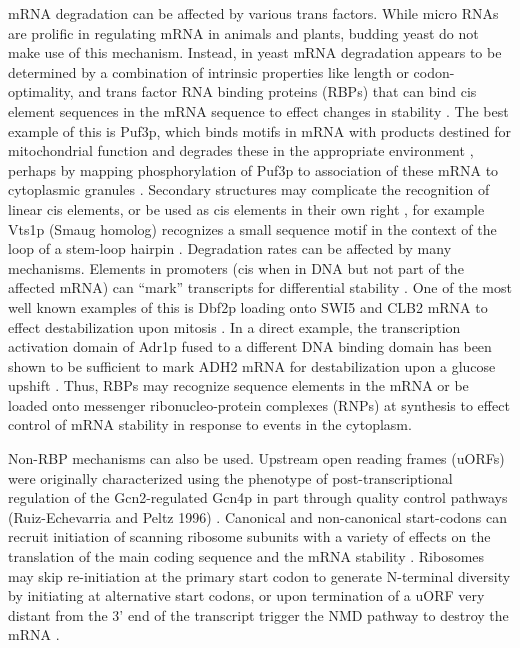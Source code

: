mRNA
degradation can be affected by various trans factors. While micro RNAs
are prolific in regulating mRNA in animals and plants, budding yeast
do not make use of this mechanism. Instead, in yeast mRNA degradation
appears to be determined by a combination of intrinsic properties like
length or codon-optimality, and trans factor RNA binding proteins
(RBPs) that can bind cis element sequences in the mRNA sequence to
effect changes in stability 
\parencite{li2010predicting,cheng2017cis}. The best
example of this is Puf3p, which binds motifs in mRNA with products
destined for mitochondrial function and degrades these in the
appropriate environment 
\parencite{olivas2000puf3,miller2013carbon}, perhaps by
mapping phosphorylation of Puf3p to association of these mRNA to
cytoplasmic granules 
\parencite{lee2015glucose}. Secondary structures may
complicate the recognition of linear cis elements, or be used as cis
elements in their own right \parencite{li2010predicting},
for example Vts1p (Smaug homolog) recognizes a small sequence 
motif in the context of the loop of a stem-loop hairpin 
\parencite{she2017comprehensive,aviv2003rna}.
Degradation rates can be affected by many mechanisms. Elements in
promoters (cis when in DNA but not part of the affected mRNA) can
“mark” transcripts for differential stability 
\parencite{haimovich2013gene}.
One of the most well known examples of this is Dbf2p loading onto SWI5
and CLB2 mRNA to effect destabilization upon mitosis 
\parencite{trcek2011single}. 
In a direct example, the transcription activation domain of
Adr1p fused to a different DNA binding domain has been shown to be
sufficient to mark ADH2 mRNA for destabilization upon a glucose
upshift \parencite{braun2016snf1}.
Thus, RBPs may recognize sequence
elements in the mRNA or be loaded onto messenger ribonucleo-protein
complexes (RNPs) at synthesis 
\parencite{gupta2016translational}
to effect control of
mRNA stability in response to events in the cytoplasm.  

Non-RBP
mechanisms can also be used. Upstream open reading frames (uORFs) were
originally characterized using the phenotype of post-transcriptional
regulation of the Gcn2-regulated Gcn4p 
\parencite{dever1992phosphorylation}
in part
through quality control pathways 
(Ruiz-Echevarria and Peltz 1996)
\parencite{ruiz1996utilizing}.
Canonical and non-canonical start-codons can recruit initiation of
scanning ribosome subunits with a variety of effects on the
translation of the main coding sequence and the mRNA stability
\parencite{spealman2017conserved}. Ribosomes may skip re-initiation at the
primary start codon to generate N-terminal diversity by initiating at
alternative start codons, or upon termination of a uORF very distant
from the 3’ end of the transcript trigger the NMD pathway to destroy
the mRNA \parencite{dever2016mechanism}. 

